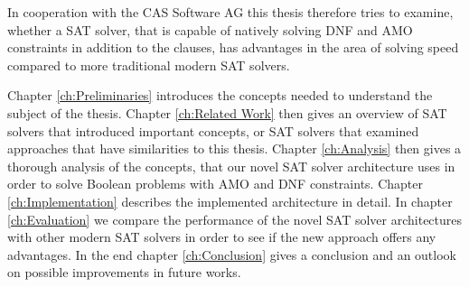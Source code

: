 In cooperation with the CAS Software AG this thesis therefore tries to examine, whether a SAT solver, that is capable of natively solving DNF and AMO constraints in addition to the clauses, has advantages in the area of solving speed compared to more traditional modern SAT solvers.

Chapter \ref{ch:Preliminaries} introduces the concepts needed to understand the subject of the thesis. Chapter \ref{ch:Related Work} then gives an overview of SAT solvers that introduced important concepts, or SAT solvers that examined approaches that have similarities to this thesis. Chapter \ref{ch:Analysis} then gives a thorough analysis of the concepts, that our novel SAT solver architecture uses in order to solve Boolean problems with AMO and DNF constraints. Chapter \ref{ch:Implementation} describes the implemented architecture in detail. In chapter \ref{ch:Evaluation} we compare the performance of the novel SAT solver architectures with other modern SAT solvers in order to see if the new approach offers any advantages. In the end chapter \ref{ch:Conclusion} gives a conclusion and an outlook on possible improvements in future works.

